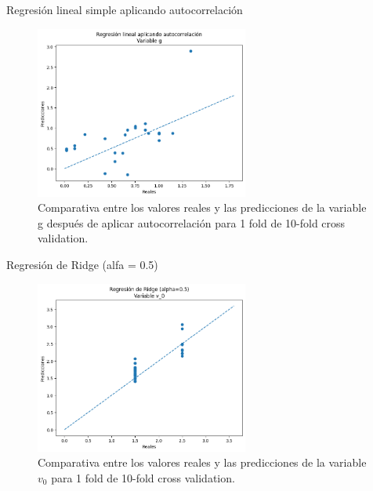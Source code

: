 \documentclass{beamer}
\begin{document}
\begin{frame}{Regresión lineal simple aplicando autocorrelación}
    
\begin{figure}
\centering
\includegraphics[width=7cm]{memoria/images/Regresión lineal aplicando autocorrelación Variable g.png}
\caption{Comparativa entre los valores reales y las predicciones de la variable g después de aplicar autocorrelación para 1 fold de 10-fold cross validation.}
\end{figure}

\end{frame}

\begin{frame}{Regresión de Ridge (alfa = 0.5)}
    
\begin{figure}
\centering
\includegraphics[width=7cm]{memoria/images/Regresión de Ridge (alpha=0.5) Variable v_0.png}
\caption{Comparativa entre los valores reales y las predicciones de la variable $v_0$ para 1 fold de 10-fold cross validation.}
\end{figure}

\end{frame}
\end{document}
